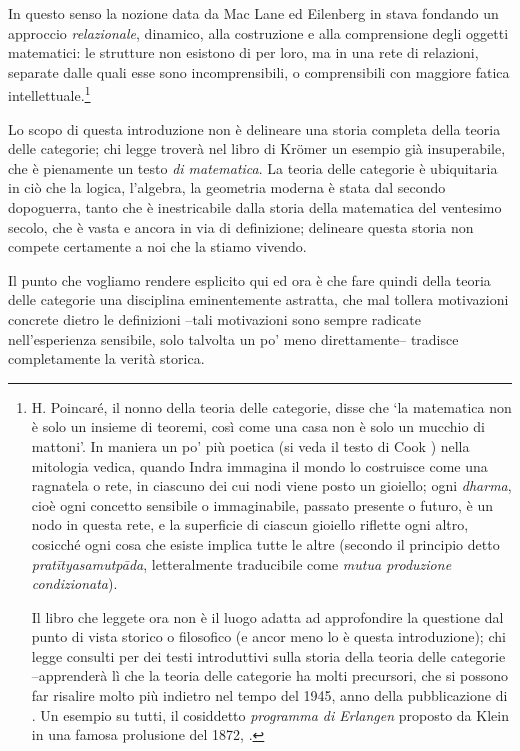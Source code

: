 In questo senso la nozione data da Mac Lane ed Eilenberg in \cite{gtone} stava fondando un approccio \emph{relazionale}, dinamico, alla costruzione e alla comprensione degli oggetti matematici: le strutture non esistono di per loro, ma in una rete di relazioni, separate dalle quali esse sono incomprensibili, o comprensibili con maggiore fatica intellettuale.\footnote{H. Poincaré, il nonno della teoria delle categorie, disse che `la matematica non è solo un insieme di teoremi, così come una casa non è solo un mucchio di mattoni'. In maniera un po' più poetica (si veda il testo di Cook \cite{Cook1977-ry}) nella mitologia vedica, quando Indra immagina il mondo lo costruisce come una ragnatela o rete, in ciascuno dei cui nodi viene posto un gioiello; ogni \emph{dharma}, cioè ogni concetto sensibile o immaginabile, passato presente o futuro, è un nodo in questa rete, e la superficie di ciascun gioiello riflette ogni altro, cosicché ogni cosa che esiste implica tutte le altre (secondo il principio detto \emph{pratītyasamutpāda}, letteralmente traducibile come \emph{mutua produzione condizionata}).

	Il libro che leggete ora non è il luogo adatta ad approfondire la questione dal punto di vista storico o filosofico (e ancor meno lo è questa introduzione); chi legge consulti \cite{marquis, kromer} per dei testi introduttivi sulla storia della teoria delle categorie --apprenderà lì che la teoria delle categorie ha molti precursori, che si possono far risalire molto più indietro nel tempo del 1945, anno della pubblicazione di \cite{gtone}. Un esempio su tutti, il cosiddetto \emph{programma di Erlangen} proposto da Klein in una famosa prolusione del 1872, \cite{Klein1893}.}

\medskip
Lo scopo di questa introduzione non è delineare una storia completa della teoria delle categorie; chi legge troverà nel libro di Kr\"omer \cite{kromer} un esempio già insuperabile, che è pienamente un testo \emph{di matematica}. La teoria delle categorie è ubiquitaria in ciò che la logica, l'algebra, la geometria moderna è stata dal secondo dopoguerra, tanto che è inestricabile dalla storia della matematica del ventesimo secolo, che è vasta e ancora in via di definizione; delineare questa storia non compete certamente a noi che la stiamo vivendo.

Il punto che vogliamo rendere esplicito qui ed ora è che fare quindi della teoria delle categorie una disciplina eminentemente astratta, che mal tollera motivazioni concrete dietro le definizioni --tali motivazioni sono sempre radicate nell'esperienza sensibile, solo talvolta un po' meno direttamente-- tradisce completamente la verità storica.

